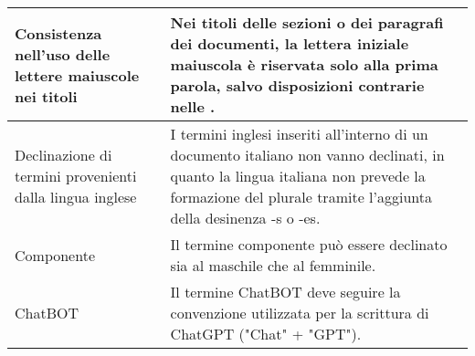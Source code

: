 \begin{adjustwidth}{-0.5cm}{-0.5cm}
\begin{longtable}{|P{4.5cm}|>{\raggedright\arraybackslash}P{9cm}|}
		\hline Consistenza nell'uso delle lettere maiuscole nei titoli & Nei titoli delle sezioni o dei paragrafi dei documenti, la lettera iniziale maiuscola è riservata solo alla prima parola, salvo disposizioni contrarie nelle \NdP. \\
		\hline Declinazione di termini provenienti dalla lingua inglese & I termini inglesi inseriti all'interno di un documento italiano non vanno declinati, in quanto la lingua italiana non prevede la formazione del plurale tramite l'aggiunta della desinenza -s o -es. \\
		\hline Componente & Il termine componente può essere declinato sia al maschile che al femminile. \\
		\hline ChatBOT & Il termine ChatBOT deve seguire la convenzione utilizzata per la scrittura di ChatGPT ("Chat" + "GPT"). \\
	\end{longtable}
\end{adjustwidth}
\egroup